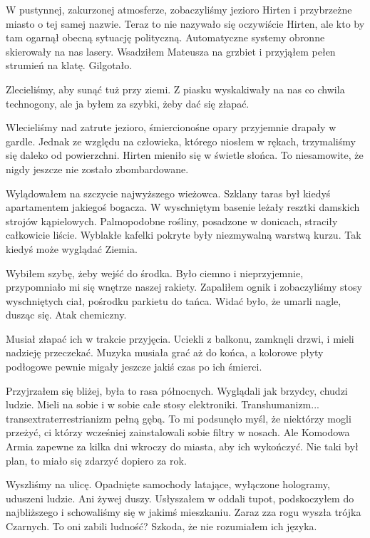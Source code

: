 W pustynnej, zakurzonej atmosferze, zobaczyliśmy jezioro Hirten i przybrzeżne miasto o tej samej nazwie.
Teraz to nie nazywało się oczywiście Hirten, ale kto by tam ogarnął obecną sytuację polityczną.
Automatyczne systemy obronne skierowały na nas lasery. 
Wsadziłem Mateusza na grzbiet i przyjąłem pełen strumień na klatę. Gilgotało.

Zlecieliśmy, aby sunąć tuż przy ziemi.
Z piasku wyskakiwały na nas co chwila technogony, ale ja byłem za szybki, żeby dać się złapać.

Wlecieliśmy nad zatrute jezioro, śmiercionośne opary przyjemnie drapały w gardle.
Jednak ze względu na człowieka, którego niosłem w rękach, trzymaliśmy się daleko od powierzchni.
Hirten mieniło się w świetle słońca. 
To niesamowite, że nigdy jeszcze nie zostało zbombardowane. 

Wylądowałem na szczycie najwyższego wieżowca. 
Szklany taras był kiedyś apartamentem jakiegoś bogacza. W wyschniętym basenie leżały resztki damskich strojów kąpielowych.
Palmopodobne rośliny, posadzone w donicach, straciły całkowicie liście.
Wyblakłe kafelki pokryte były niezmywalną warstwą kurzu.
Tak kiedyś może wyglądać Ziemia.

Wybiłem szybę, żeby wejść do środka.
Było ciemno i nieprzyjemnie, przypomniało mi się wnętrze naszej rakiety.
Zapaliłem ognik i zobaczyliśmy stosy wyschniętych ciał, pośrodku parkietu do tańca.
Widać było, że umarli nagle, dusząc się. Atak chemiczny.

Musiał złapać ich w trakcie przyjęcia.
Uciekli z balkonu, zamknęli drzwi, i mieli nadzieję przeczekać.
Muzyka musiała grać aż do końca, a kolorowe płyty podłogowe pewnie migały jeszcze jakiś czas po ich śmierci.

Przyjrzałem się bliżej, była to rasa północnych.
Wyglądali jak brzydcy, chudzi ludzie.
Mieli na sobie i w sobie całe stosy elektroniki.
Transhumanizm... transextraterrestrianizm pełną gębą.
To mi podsunęło myśl, że niektórzy mogli przeżyć, ci którzy wcześniej zainstalowali sobie filtry w nosach.
Ale Komodowa Armia zapewne za kilka dni wkroczy do miasta, aby ich wykończyć.
Nie taki był plan, to miało się zdarzyć dopiero za rok.

Wyszliśmy na ulicę. Opadnięte samochody latające, wyłączone hologramy, uduszeni ludzie.
Ani żywej duszy. Usłyszałem w oddali tupot, podskoczyłem do najbliższego i schowaliśmy się w jakimś mieszkaniu.
Zaraz zza rogu wyszła trójka Czarnych. To oni zabili ludność?
Szkoda, że nie rozumiałem ich języka.

